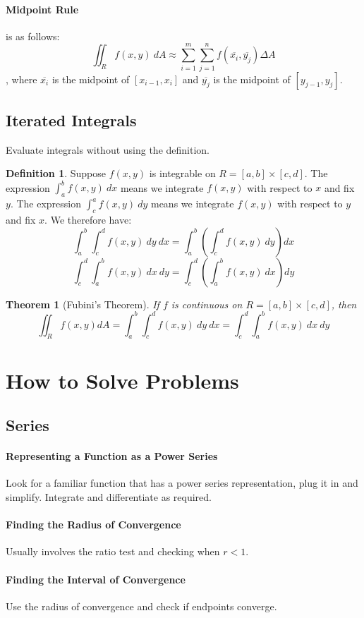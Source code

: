 \documentclass[12 pt]{article}
\newtheorem{thm}{Theorem}
\theoremstyle{definition}
\newtheorem{defn}{Definition}
\begin{document}
 \paragraph{Midpoint Rule} is as follows:
 $$ \iint_{R}f(x,y)\ dA \approx \sum_{i=1}^m \sum_{j=1}^n f(\overline{x_i},\overline{y_j}) \Delta A$$, where $\overline{x_i}$ is the midpoint of $[x_{i-1},x_i]$ and $\overline{y_j}$ is the midpoint of $[y_{j-1},y_j]$.
 \subsection{Iterated Integrals} Evaluate integrals without using the definition.
 \begin{defn}
   Suppose $f(x,y)$ is integrable on $R=[a,b]\times [c,d]$. The expression $\int_{a}^{b}f(x,y)\ dx$ means we integrate $f(x,y)$ with respect to $x$ and fix $y$. The expression $\int_{c}^{a}f(x,y)\ dy$ means we integrate $f(x,y)$ with respect to $y$ and fix $x$. We therefore have:
   $$ \int_{a}^{b}\int_{c}^d f(x,y) \ dy \ dx = \int_{a}^b \left(\int_{c}^d f(x,y)\ dy\right) dx $$
   $$ \int_{c}^{d}\int_{a}^b f(x,y) \ dx \ dy = \int_{c}^d \left(\int_{a}^b f(x,y)\ dx\right) dy $$
 \end{defn}
 \begin{thm}[Fubini's Theorem]
   If $f$ is continuous on $R=[a,b]\times [c,d]$, then
   $$ \iint_{R}f(x,y)dA =\int_{a}^{b}\int_{c}^{d}f(x,y)\ dy \ dx = \int_{c}^d \int_{a}^{b}f(x,y) \ dx \ dy $$
 \end{thm}

\section{How to Solve Problems}
\subsection{Series}
\paragraph{Representing a Function as a Power Series} Look for a familiar function that has a power series representation, plug it in and simplify. Integrate and differentiate as required.
\paragraph{Finding the Radius of Convergence} Usually involves the ratio test and checking when $r<1$.
\paragraph{Finding the Interval of Convergence} Use the radius of convergence and check if endpoints converge.
\end{document}
